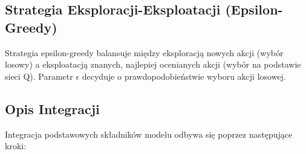\documentclass[conference]{IEEEtran}
\begin{document}
\subsection{Strategia Eksploracji-Eksploatacji (Epsilon-Greedy)}

Strategia epsilon-greedy balansuje między eksploracją nowych akcji (wybór losowy) a eksploatacją znanych, najlepiej ocenianych akcji (wybór na podstawie sieci Q). Parametr \(\epsilon\) decyduje o prawdopodobieństwie wyboru akcji losowej.

\subsection{Opis Integracji}

Integracja podstawowych składników modelu odbywa się poprzez następujące kroki:
\end{document}
